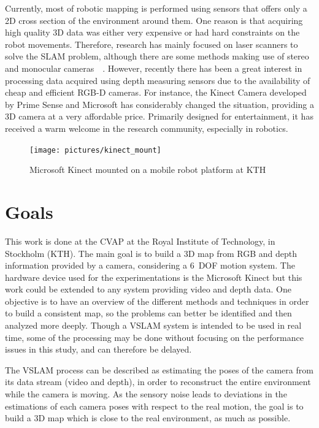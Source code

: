 Currently, most of robotic mapping is performed using sensors that offers only a 2D cross section of the environment around them. One reason is that acquiring high quality 3D data was either very expensive or had hard constraints on the robot movements. Therefore, research has mainly focused on laser scanners to solve the \gls{SLAM} problem, although there are some methods making use of stereo and monocular cameras~\cite{KonoligeA08}~\cite{StrasdatMD10}. However, recently there has been a great interest in processing data acquired using depth measuring sensors due to the availability of cheap and efficient RGB-D cameras. For instance, the Kinect Camera developed by Prime Sense and Microsoft has considerably changed the situation, providing a 3D camera at a very affordable price. Primarily designed for entertainment, it has received a warm welcome in the research community, especially in robotics.

\begin{figure}[H]
\centering
\texttt{[image: pictures/kinect\_mount]}
\caption{Microsoft Kinect mounted on a mobile robot platform at KTH}
\end{figure}

\clearpage
\section{Goals}

This work is done at the \gls{CVAP} at the Royal Institute of Technology, in Stockholm (KTH). The main goal is to build a 3D map from RGB and depth information provided by a camera, considering a 6~\gls{DOF} motion system. The hardware device used for the experimentations is the Microsoft Kinect but this work could be extended to any system providing video and depth data. One objective is to have an overview of the different methods and techniques in order to build a consistent map, so the problems can better be identified and then analyzed more deeply. Though a \gls{VSLAM} system is intended to be used in real time, some of the processing may be done without focusing on the performance issues in this study, and can therefore be delayed. 

The \gls{VSLAM} process can be described as estimating the poses of the camera from its data stream (video and depth), in order to reconstruct the entire environment while the camera is moving. As the sensory noise leads to deviations in the estimations of each camera poses with respect to the real motion, the goal is to build a 3D map which is close to the real environment, as much as possible.

